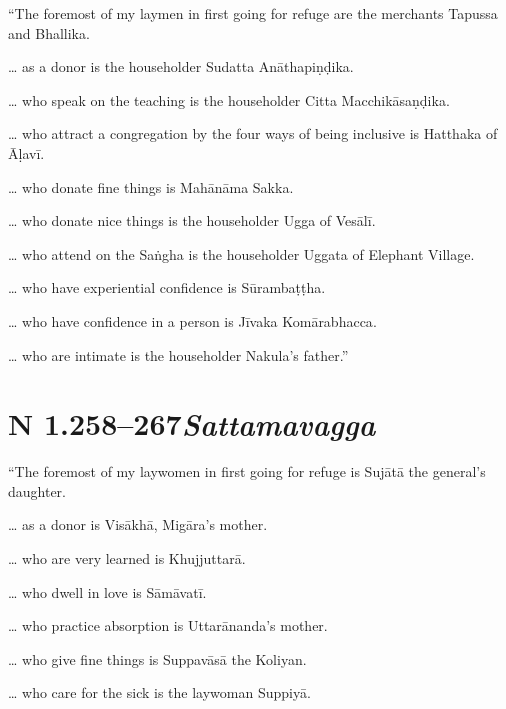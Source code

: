 \documentclass[12pt,openany]{book}%
\newcommand*{\suttatitleacronym}[1]{\smaller[2]{#1}\vspace*{.3em}}
\newcommand*{\suttatitleroot}[1]{\linebreak\smaller[2]\itshape{#1}}
\newcommand*{\tocacronym}[1]{\hspace*{-3.3em}{#1}\quad}
\newcommand*{\tocroot}[1]{(\textit{#1})}
\begin{document}
“The foremost of my laymen in first going for refuge are the merchants Tapussa and Bhallika. 

… as a donor is the householder Sudatta \textsanskrit{Anāthapiṇḍika}. 

… who speak on the teaching is the householder Citta \textsanskrit{Macchikāsaṇḍika}. 

… who attract a congregation by the four ways of being inclusive is Hatthaka of \textsanskrit{Āḷavī}. 

… who donate fine things is \textsanskrit{Mahānāma} Sakka. 

… who donate nice things is the householder Ugga of \textsanskrit{Vesālī}. 

… who attend on the \textsanskrit{Saṅgha} is the householder Uggata of Elephant Village. 

… who have experiential confidence is \textsanskrit{Sūrambaṭṭha}. 

… who have confidence in a person is \textsanskrit{Jīvaka} \textsanskrit{Komārabhacca}. 

… who are intimate is the householder Nakula’s father.” 

%
\section*{{\suttatitleacronym AN 1.258–267}{\suttatitleroot Sattamavagga}}
\addcontentsline{toc}{section}{\tocacronym{AN 1.258–267} \tocroot{Sattamavagga}}

“The foremost of my laywomen in first going for refuge is \textsanskrit{Sujātā} the general’s daughter. 

… as a donor is \textsanskrit{Visākhā}, \textsanskrit{Migāra}’s mother. 

… who are very learned is \textsanskrit{Khujjuttarā}. 

… who dwell in love is \textsanskrit{Sāmāvatī}. 

… who practice absorption is \textsanskrit{Uttarānanda}’s mother. 

… who give fine things is \textsanskrit{Suppavāsā} the Koliyan. 

… who care for the sick is the laywoman \textsanskrit{Suppiyā}. 
\end{document}
